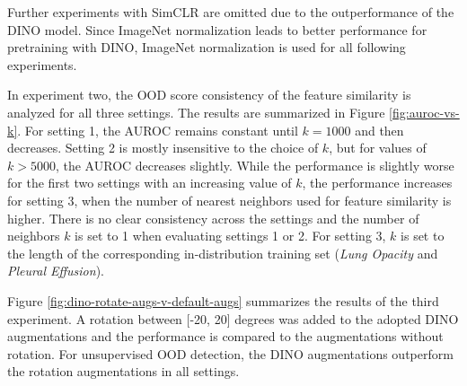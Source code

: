 Further experiments with SimCLR are omitted due to the outperformance of the DINO model.
Since ImageNet normalization leads to better performance for pretraining with DINO, ImageNet normalization is used for all following experiments.
\par
In experiment two, the OOD score consistency of the feature similarity is analyzed for all three settings.
The results are summarized in Figure \ref{fig:auroc-vs-k}.
For setting 1, the AUROC remains constant until $k=1000$ and then decreases.
Setting 2 is mostly insensitive to the choice of $k$, but for values of $k>5000$, the AUROC decreases slightly.
While the performance is slightly worse for the first two settings with an increasing value of $k$, the performance increases for setting 3, when the number of nearest neighbors used for feature similarity is higher.
There is no clear consistency across the settings and the number of neighbors $k$ is set to 1 when evaluating settings 1 or 2.
For setting 3, $k$ is set to the length of the corresponding in-distribution training set (\textit{Lung Opacity} and \textit{Pleural Effusion}).
\par
Figure \ref{fig:dino-rotate-augs-v-default-augs} summarizes the results of the third experiment.
A rotation between [-20, 20] degrees was added to the adopted DINO augmentations and the performance is compared to the augmentations without rotation.
For unsupervised OOD detection, the DINO augmentations outperform the rotation augmentations in all settings.
